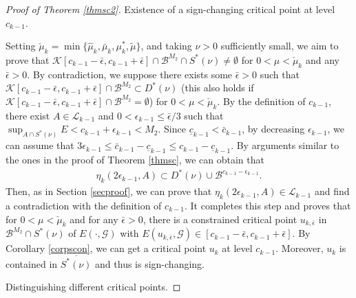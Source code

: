\documentclass[10pt,a4paper]{article}
\theoremstyle{definition} \theoremstyle{remark}
\numberwithin{equation}{section}
\newcommand{\G}{\mathcal{G}}
\newcommand{\B}{\mathcal{B}}
\newcommand{\K}{\mathcal{K}}
\newcommand{\cl}{\mathcal{L}}
\begin{document}
\begin{proof}[Proof of Theorem \ref{thmsc2}]
	\vskip0.1in
	 Existence of a sign-changing critical point at level $c_{k-1}$.
	
	Setting $\check{\mu}_k = \min\{\hat{\mu}_k, \bar{\mu}_k, \mu^*_k, \tilde{\mu}\}$, and taking $\nu > 0$ sufficiently small, we aim to prove that $\K[c_{k-1}-\bar{\epsilon},c_{k-1}+\bar{\epsilon}] \cap \B^{M_2} \cap S^*(\nu) \neq \emptyset$ for $0 < \mu < \check{\mu}_k$ and any $\bar{\epsilon} > 0$. By contradiction, we suppose there exists some $\bar{\epsilon} > 0$ such that $\K[c_{k-1}-\bar{\epsilon},c_{k-1}+\bar{\epsilon}] \cap \B^{M_2} \subset D^*(\nu)$ (this also holds if $\K[c_{k-1}-\bar{\epsilon},c_{k-1}+\bar{\epsilon}] \cap \B^{M_2} = \emptyset$) for $0 < \mu < \check{\mu}_k$. By the definition of $c_{k-1}$, there exist $A \in \mathcal{L}_{k-1}$ and $0 < \epsilon_{k-1} \leq \bar{\epsilon}/3$ such that $\sup_{A \cap S^*(\nu)}E < c_{k-1} + \epsilon_{k-1} < M_2$. Since $\underline{c}_{k-1} < \bar{c}_{k-1}$, by decreasing $\epsilon_{k-1}$, we can assume that $3\epsilon_{k-1} \leq \bar{c}_{k-1} - \underline{c}_{k-1} \leq c_{k-1} - \underline{c}_{k-1}$. By arguments similar to the ones in the proof of Theorem \ref{thmsc}, we can obtain that
	\begin{align*} 
		\eta_k(2\epsilon_{k-1},A) \subset D^*(\nu) \cup \B^{c_{k-1}-\epsilon_{k-1}}.
	\end{align*}
   Then, as in Section \ref{secproof}, we can prove that $\eta_k(2\epsilon_{k-1},A) \in \cl_{k-1}$ and find a contradiction with the definition of $c_{k-1}$. %
    It completes this step and proves that for $0 < \mu < \check{\mu}_k$ and for any $\bar{\epsilon} > 0$, there is a constrained critical point $u_{k,\bar \epsilon}$ in  $\B^{M_2} \cap S^*(\nu)$ of $E(\cdot,\G)$ with $E(u_{k,\bar \epsilon},\G) \in [c_{k-1}-\bar{\epsilon},c_{k-1}+\bar{\epsilon}]$. By Corollary \ref{corpscon}, we can get a critical point $u_k$ at level $c_{k-1}$. Moreover, $u_k$ is contained in $\overline{S^*(\nu)}$ and thus is sign-changing.
	
	\vskip0.1in
	 Distinguishing different critical points.
	

\end{proof}
\end{document}
